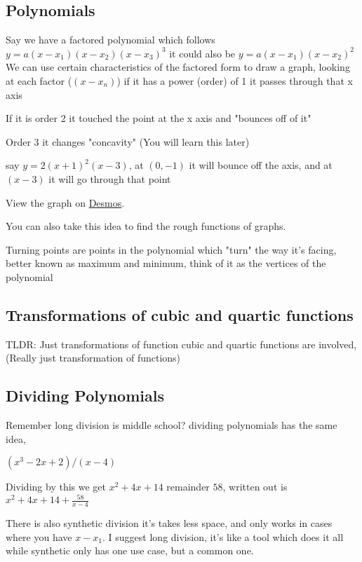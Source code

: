 \documentclass[../main.tex]{subfiles}
\begin{document}
\subsection{Polynomials}

Say we have a factored polynomial which follows $y=a(x-x_1)(x-x_2)(x-x_3)^3$ it could also be $y=a(x-x_1)(x-x_2)^2$ We can use certain characteristics of the factored form to draw a graph, looking at each factor ($(x-x_n)$) if it has a power (order) of 1 it passes through that x axis

\noindent If it is order 2 it touched the point at the x axis and "bounces off of it"

\noindent Order 3 it changes "concavity" (You will learn this later)

say $y=2(x+1)^2(x-3)$, at $(0,-1)$ it will bounce off the axis, and at $(x-3)$ it will go through that point

View the graph on \hyperlink{https://www.desmos.com/calculator/zn0lesjogb}{Desmos}.

You can also take this idea to find the rough functions of graphs.

Turning points are points in the polynomial which "turn" the way it's facing, better known as maximum and minimum, think of it as the vertices of the polynomial

\subsection{Transformations of cubic and quartic functions}

TLDR: Just transformations of function cubic and quartic functions are involved, (Really just transformation of functions)

\subsection{Dividing Polynomials}

Remember long division is middle school?  dividing polynomials has the same idea,

$(x^3-2x+2)/(x-4)$


Dividing by this we get $x^2+4x+14$ remainder $58$, written out is $x^2+4x+14+\frac{58}{x-4}$

There is also synthetic division it's takes less space, and only works in cases where you have $x-x_1$. I suggest long division, it's like a tool which does it all while synthetic only has one use case, but a common one.
\end{document}
